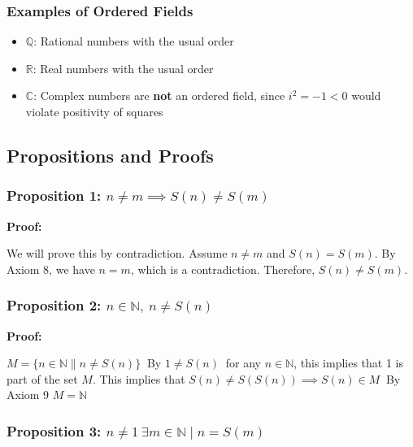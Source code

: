 \subsubsection{Examples of Ordered Fields}

\begin{itemize}[label=\(-\)]
    \item \( \mathbb{Q} \): Rational numbers with the usual order
    \item \( \mathbb{R} \): Real numbers with the usual order
    \item \( \mathbb{C} \): Complex numbers are \textbf{not} an ordered field, since \( i^2 = -1 < 0 \) would violate positivity of squares
\end{itemize}


\subsection{Propositions and Proofs}

\subsubsection{Proposition 1: \texorpdfstring{\(n \ne m \implies S(n) \ne S(m)\)}{n!= m implies S (n)!=S (m)}}

\textbf{Proof:} 

We will prove this by contradiction. Assume \( n \ne m \) and \( S(n) = S(m) \). By Axiom 8, we have \( n = m \), which is a contradiction. Therefore, \( S(n) \ne S(m) \).

\subsubsection{Proposition 2: \texorpdfstring{ \(n \in \mathbb{N},\ n \ne S(n)\)}{For any n in N, n!= S (n)}}

\textbf{Proof:} 

\(M = \{n \in \mathbb{N} \| n \ne S(n) \}\ \)
By \(1 \ne S(n)\ \) for any \(n \in \mathbb{N}\), this implies that 1 is part of the set \(M\). This implies that \(S(n) \ne S(S(n)) \implies S(n) \in M\ \) By Axiom 9 \(M = \mathbb{N}\)

\subsubsection{Proposition 3: \texorpdfstring{\(n \ne 1\ \exists m \in \mathbb{N} \mid n = S(m)\)}{n!= 1, exists m in N | n = S (m)}}

